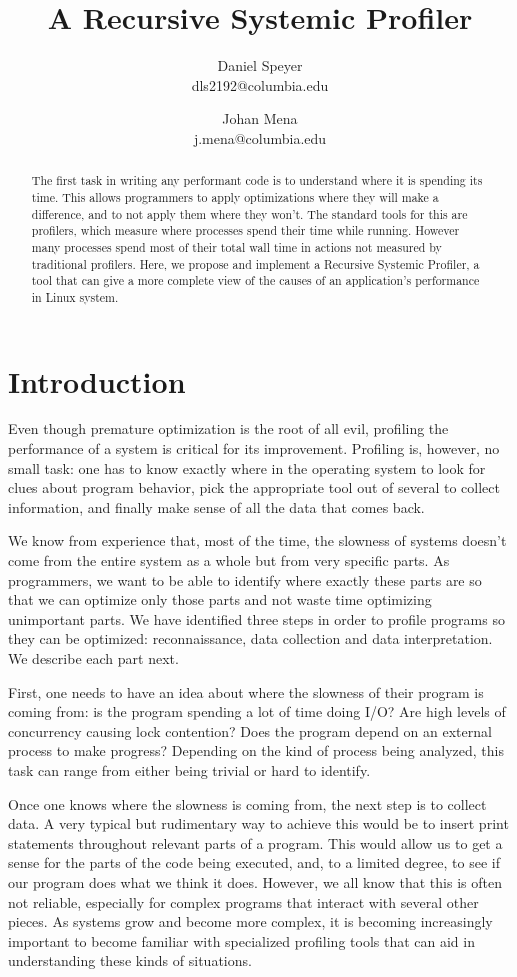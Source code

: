 \documentclass{article}
\author{Daniel Speyer\\dls2192@columbia.edu \and Johan Mena\\j.mena@columbia.edu}
\title{\textbf{A Recursive Systemic Profiler}}
\date{}
\begin{document}
\maketitle

\begin{abstract}
The first task in writing any performant code is to understand where it is spending its time. This allows programmers to apply optimizations where they will make a difference, and to not apply them where they won't. The standard tools for this are profilers, which measure where processes spend their time while running. However many processes spend most of their total wall time in actions not measured by traditional profilers. Here, we propose and implement a Recursive Systemic Profiler, a tool that can give a more complete view of the causes of an application’s performance in Linux system.
\end{abstract}

\section{Introduction}
Even though premature optimization is the root of all evil, profiling the performance of a system is critical for its improvement. Profiling is, however, no small task: one has to know exactly where in the operating system to look for clues about program behavior, pick the appropriate tool out of several to collect information, and finally make sense of all the data that comes back.

We know from experience that, most of the time, the slowness of systems doesn't come from the entire system as a whole but from very specific parts. As programmers, we want to be able to identify where exactly these parts are so that we can optimize only those parts and not waste time optimizing unimportant parts. We have identified three steps in order to profile programs so they can be optimized: reconnaissance, data collection and data interpretation. We describe each part next.

First, one needs to have an idea about where the slowness of their program is coming from: is the program spending a lot of time doing I/O? Are high levels of concurrency causing lock contention? Does the program depend on an external process to make progress? Depending on the kind of process being analyzed, this task can range from either being trivial or hard to identify.

Once one knows where the slowness is coming from, the next step is to collect data. A very typical but rudimentary way to achieve this would be to insert print statements throughout relevant parts of a program. This would allow us to get a sense for the parts of the code being executed, and, to a limited degree, to see if our program does what we think it does. However, we all know that this is often not reliable, especially for complex programs that interact with several other pieces. As systems grow and become more complex, it is becoming increasingly important to become familiar with specialized profiling tools that can aid in understanding these kinds of situations.
\end{document}
